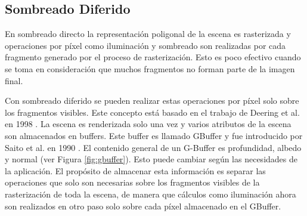 \subsection{Sombreado Diferido}
\label{sub:deferred_rendering_theory}
En sombreado directo la representación poligonal de la escena es rasterizada y operaciones por píxel como iluminación y sombreado son realizadas por cada fragmento generado por el proceso de rasterización. Esto es poco efectivo cuando se toma en consideración que muchos fragmentos no forman parte de la imagen final.

Con sombreado diferido se pueden realizar estas operaciones por píxel solo sobre los fragmentos visibles. Este concepto está basado en el trabajo de Deering et al. en 1998 \cite{Deering:1988}. La escena es renderizada solo una vez y varios atributos de la escena son almacenados en buffers. Este buffer es llamado \ac{GBuffer} y fue introducido por Saito et al. en 1990 \cite{Saito:1990}. El contenido general de un G-Buffer es profundidad, albedo y normal (ver Figura \ref{fig:gbuffer}). Esto puede cambiar según las necesidades de la aplicación. El propósito de almacenar esta información es separar las operaciones que solo son necesarias sobre los fragmentos visibles de la rasterización de toda la escena, de manera que cálculos como iluminación ahora son realizados en otro paso solo sobre cada píxel almacenado en el \ac{GBuffer}.

